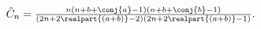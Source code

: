 $\tilde{C}_{n}=\frac{n(n+b+\conj{a}-1)(n+b+\conj{b}-1)}{(2n+2\realpart{(a+b)}-2%
)(2n+2\realpart{(a+b)}-1)}.$